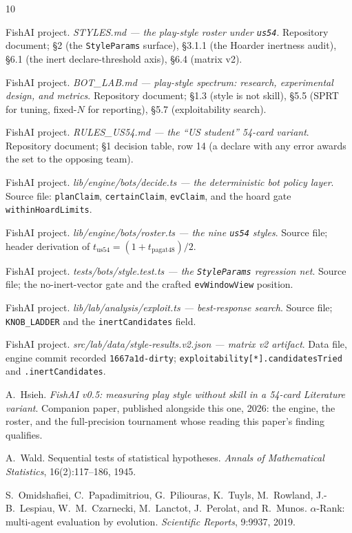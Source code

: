 \documentclass[11pt]{article}
\newcommand{\code}[1]{\texttt{#1}}
\begin{document}
\begin{thebibliography}{10}
\small

FishAI project.
\emph{STYLES.md --- the play-style roster under \code{us54}}.
Repository document; \S2 (the \code{StyleParams} surface), \S3.1.1 (the Hoarder inertness
audit), \S6.1 (the inert declare-threshold axis), \S6.4 (matrix v2).

FishAI project.
\emph{BOT\_LAB.md --- play-style spectrum: research, experimental design, and metrics}.
Repository document; \S1.3 (style is not skill), \S5.5 (SPRT for tuning, fixed-$N$ for
reporting), \S5.7 (exploitability search).

FishAI project.
\emph{RULES\_US54.md --- the ``US student'' 54-card variant}.
Repository document; \S1 decision table, row 14 (a declare with any error awards the set to the
opposing team).

FishAI project.
\emph{lib/engine/bots/decide.ts --- the deterministic bot policy layer}.
Source file: \code{planClaim}, \code{certainClaim}, \code{evClaim}, and the hoard gate
\code{withinHoardLimits}.

FishAI project.
\emph{lib/engine/bots/roster.ts --- the nine \code{us54} styles}.
Source file; header derivation of $t_{\mathrm{us54}} = (1 + t_{\mathrm{pagat48}})/2$.

FishAI project.
\emph{tests/bots/style.test.ts --- the \code{StyleParams} regression net}.
Source file; the no-inert-vector gate and the crafted \code{evWindowView} position.

FishAI project.
\emph{lib/lab/analysis/exploit.ts --- best-response search}.
Source file; \code{KNOB\_LADDER} and the \code{inertCandidates} field.

FishAI project.
\emph{src/lab/data/style-results.v2.json --- matrix v2 artifact}.
Data file, engine commit recorded \code{1667a1d-dirty};
\code{exploitability[*].candidatesTried} and \code{.inertCandidates}.

A.~Hsieh.
\emph{FishAI v0.5: measuring play style without skill in a 54-card Literature variant}.
Companion paper, published alongside this one, 2026: the engine, the roster, and the
full-precision tournament whose reading this paper's finding qualifies.

A.~Wald.
Sequential tests of statistical hypotheses.
\emph{Annals of Mathematical Statistics}, 16(2):117--186, 1945.

S.~Omidshafiei, C.~Papadimitriou, G.~Piliouras, K.~Tuyls, M.~Rowland, J.-B.~Lespiau,
W.~M.~Czarnecki, M.~Lanctot, J.~Perolat, and R.~Munos.
$\alpha$-Rank: multi-agent evaluation by evolution.
\emph{Scientific Reports}, 9:9937, 2019.

\end{thebibliography}
\end{document}
